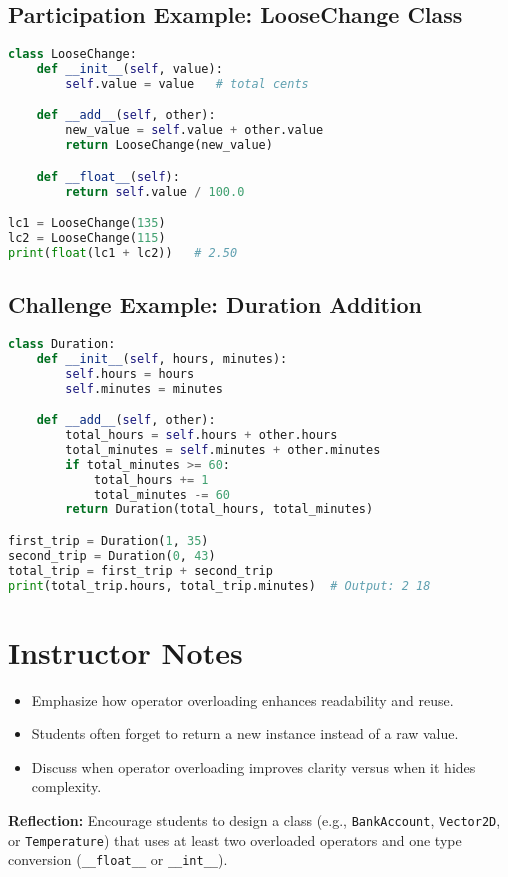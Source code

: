 \subsection*{Participation Example: LooseChange Class}

\begin{lstlisting}[language=Python, caption={A simple numeric class using operator overloading}]
class LooseChange:
    def __init__(self, value):
        self.value = value   # total cents

    def __add__(self, other):
        new_value = self.value + other.value
        return LooseChange(new_value)

    def __float__(self):
        return self.value / 100.0

lc1 = LooseChange(135)
lc2 = LooseChange(115)
print(float(lc1 + lc2))   # 2.50
\end{lstlisting}

\subsection*{Challenge Example: Duration Addition}

\begin{lstlisting}[language=Python, caption={Operator overloading for adding durations}]
class Duration:
    def __init__(self, hours, minutes):
        self.hours = hours
        self.minutes = minutes

    def __add__(self, other):
        total_hours = self.hours + other.hours
        total_minutes = self.minutes + other.minutes
        if total_minutes >= 60:
            total_hours += 1
            total_minutes -= 60
        return Duration(total_hours, total_minutes)

first_trip = Duration(1, 35)
second_trip = Duration(0, 43)
total_trip = first_trip + second_trip
print(total_trip.hours, total_trip.minutes)  # Output: 2 18
\end{lstlisting}

\section*{Instructor Notes}

\begin{itemize}
  \item Emphasize how operator overloading enhances readability and reuse.
  \item Students often forget to return a new instance instead of a raw value.
  \item Discuss when operator overloading improves clarity versus when it hides complexity.
\end{itemize}

\bigskip
\noindent
\textbf{Reflection:}  
Encourage students to design a class (e.g., \texttt{BankAccount}, \texttt{Vector2D}, or \texttt{Temperature})  
that uses at least two overloaded operators and one type conversion (\texttt{\_\_float\_\_} or \texttt{\_\_int\_\_}).


